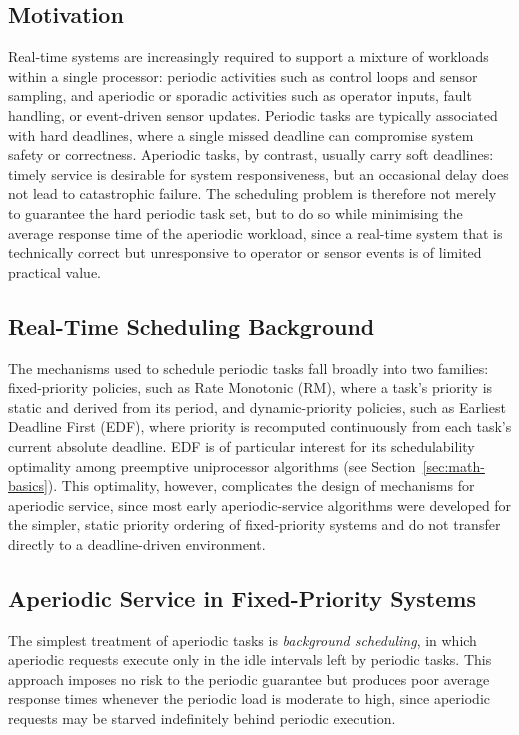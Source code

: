 \documentclass[conference]{IEEEtran}
\begin{document}
    \subsection{Motivation}
    Real-time systems are increasingly required to support a mixture of workloads within a single processor: periodic activities such as control loops and sensor sampling, and aperiodic or sporadic activities such as operator inputs, fault handling, or event-driven sensor updates. Periodic tasks are typically associated with hard deadlines, where a single missed deadline can compromise system safety or correctness. Aperiodic tasks, by contrast, usually carry soft deadlines: timely service is desirable for system responsiveness, but an occasional delay does not lead to catastrophic failure. The scheduling problem is therefore not merely to guarantee the hard periodic task set, but to do so while minimising the average response time of the aperiodic workload, since a real-time system that is technically correct but unresponsive to operator or sensor events is of limited practical value.

    \subsection{Real-Time Scheduling Background}
    The mechanisms used to schedule periodic tasks fall broadly into two families: fixed-priority policies, such as Rate Monotonic (RM), where a task's priority is static and derived from its period, and dynamic-priority policies, such as Earliest Deadline First (EDF), where priority is recomputed continuously from each task's current absolute deadline. EDF is of particular interest for its schedulability optimality among preemptive uniprocessor algorithms (see Section~\ref{sec:math-basics}). This optimality, however, complicates the design of mechanisms for aperiodic service, since most early aperiodic-service algorithms were developed for the simpler, static priority ordering of fixed-priority systems and do not transfer directly to a deadline-driven environment.

    \subsection{Aperiodic Service in Fixed-Priority Systems}
    The simplest treatment of aperiodic tasks is \emph{background scheduling}, in which aperiodic requests execute only in the idle intervals left by periodic tasks. This approach imposes no risk to the periodic guarantee but produces poor average response times whenever the periodic load is moderate to high, since aperiodic requests may be starved indefinitely behind periodic execution.
\end{document}
